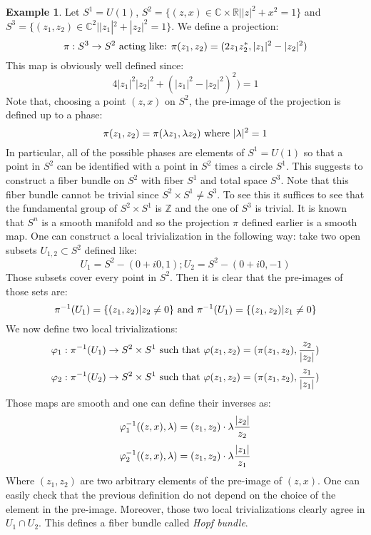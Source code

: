 \documentclass[12pt,a4paper]{report}
\theoremstyle{definition}
\theoremstyle{Theorem}
\theoremstyle{definition}
\newtheorem{Ex}[Def]{Example}
\theoremstyle{definition}
\begin{document}
	\begin{Ex}\label{Ex_3.1.3}
		Let $S^1=U(1)$, $S^2=\{(z,x)\in\mathbb{C}\times\mathbb{R}||z|^2+x^2=1\}$ and $S^3=\{(z_1,z_2)\in\mathbb{C}^2||z_1|^2+|z_2|^2=1\}$. We define a projection:
		$$\pi:S^3\rightarrow S^2\hbox{ acting like: }\pi(z_1,z_2)=(2z_1z_2^*,|z_1|^2-|z_2|^2)$$
		This map is obviously well defined since:
		$$4|z_1|^2|z_2|^2+(|z_1|^2-|z_2|^2)^2)=1$$
		Note that, choosing a point $(z,x)$ on $S^2$, the pre-image of the projection is defined up to a phase:
		$$\pi(z_1,z_2)=\pi(\lambda z_1,\lambda z_2)\hbox{ where }|\lambda|^2=1$$
		In particular, all of the possible phases are elements of $S^1=U(1)$ so that a point in $S^2$ can be identified with a point in $S^2$ times a circle $S^1$. This suggests to construct a fiber bundle on $S^2$ with fiber $S^1$ and total space $S^3$. Note that this fiber bundle cannot be trivial since $S^2\times S^1\neq S^3$. To see this it suffices to see that the fundamental group of $S^2\times S^1$ is $\mathbb{Z}$ and the one of $S^3$ is trivial.
		It is known that $S^n$ is a smooth manifold and so the projection $\pi$ defined earlier is a smooth map. One can construct a local trivialization in the following way: take two open subsets $U_{1,2}\subset S^2$ defined like:
		$$U_1=S^2-(0+i0,1);U_2=S^2-(0+i0,-1)$$
		Those subsets cover every point in $S^2$. Then it is clear that the pre-images of those sets are:
		$$\pi^{-1}(U_1)=\{(z_1,z_2)|z_2\neq 0\}\hbox{ and }\pi^{-1}(U_1)=\{(z_1,z_2)|z_1\neq 0\}$$
		We now define two local trivializations:
		$$\varphi_1:\pi^{-1}(U_1)\rightarrow S^2\times S^1\hbox{ such that }\varphi(z_1,z_2)=(\pi(z_1,z_2),{z_2\over |z_2|})$$
		$$\varphi_2:\pi^{-1}(U_2)\rightarrow S^2\times S^1\hbox{ such that }\varphi(z_1,z_2)=(\pi(z_1,z_2),{z_1\over |z_1|})$$
		Those maps are smooth and one can define their inverses as:
		$$\varphi_1^{-1}((z,x),\lambda)=(z_1,z_2)\cdot\lambda{|z_2|\over z_2}$$
		$$\varphi_2^{-1}((z,x),\lambda)=(z_1,z_2)\cdot\lambda{|z_1|\over z_1}$$
		Where $(z_1,z_2)$ are two arbitrary elements of the pre-image of $(z,x)$. One can easily check that the previous definition do not depend on the choice of the element in the pre-image. Moreover, those two local trivializations clearly agree in $U_1\cap U_2$. This defines a fiber bundle called \textit{Hopf bundle}.
	\end{Ex}
\end{document}
